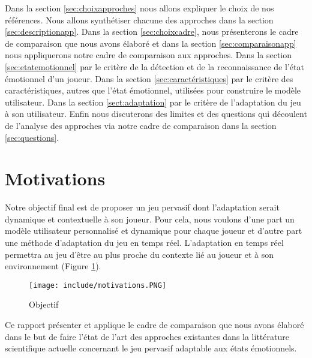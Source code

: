 \documentclass{article}
\begin{document}
    Dans la section \ref{sec:choixapproches} nous allons expliquer le choix de nos références.
    Nous allons synthétiser chacune des approches dans la section \ref{sec:descriptionapp}.
    Dans la section \ref{sec:choixcadre}, nous présenterons le cadre de comparaison que nous avons élaboré et dans la section \ref{sec:comparaisonapp} nous appliquerons notre cadre de comparaison aux approches. 
    Dans la section \ref{sec:etatemotionnel} par le critère de la détection et de la reconnaissance de l'état émotionnel d'un joueur. 
    Dans la section \ref{sec:caractéristiques} par le critère des caractéristiques, autres que l'état émotionnel, utilisées pour construire le modèle utilisateur. 
    Dans la section \ref{sect:adaptation} par le critère de l'adaptation du jeu à son utilisateur. 
    Enfin nous discuterons des limites et des questions qui découlent de l'analyse des approches via notre cadre de comparaison dans la section \ref{sec:questions}.

\section{Motivations}\label{sec:motivations}
    Notre objectif final est de proposer un jeu pervasif dont l'adaptation serait dynamique et contextuelle à son joueur. 
    Pour cela, nous voulons d'une part un modèle utilisateur personnalisé et dynamique pour chaque joueur et d'autre part une méthode d'adaptation du jeu en temps réel. L'adaptation en temps réel permettra au jeu d'être au plus proche du contexte lié au joueur et à son environnement (Figure \ref{fig:objectif}).\par
    \begin{figure}
        \centering
        \texttt{[image: include/motivations.PNG]}
        \caption{Objectif}
        \label{fig:objectif}
    \end{figure}
    Ce rapport présenter et applique le cadre de comparaison que nous avons élaboré dans le but de faire l'état de l'art des approches existantes dans la littérature scientifique actuelle concernant le jeu pervasif adaptable aux états émotionnels.
\end{document}
